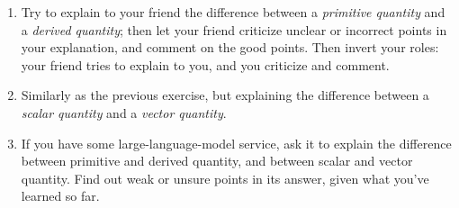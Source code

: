 \documentclass[a4paper,12pt,%
onecolumn,oneside,%
british%
]{memoir}
\newcommand{\elabel}[1]{\label{#1}\marginpar{\vspace{-1.3\baselineskip}\hspace{-8em}\footnotesize Solution p.~\pageref{#1_sol}}}
\renewcommand*{\|}[1][]{\nonscript\:#1\vert\nonscript\:\mathopen{}}
\begin{document}
\begin{enumerate}[exerc]
\item Try to explain to your friend the difference between a \emph{primitive quantity} and a \emph{derived quantity}; then let your friend criticize unclear or incorrect points in your explanation, and comment on the good points. Then invert your roles: your friend tries to explain to you, and you criticize and comment.

\item Similarly as the previous exercise, but explaining the difference between a \emph{scalar quantity} and a \emph{vector quantity}.

\item If you have some large-language-model service, ask it to explain the difference between primitive and derived quantity, and between scalar and vector quantity. Find out weak or unsure points in its answer, given what you've learned so far.
\end{enumerate}

\section{}\elabel{sec:units_functions}
\end{document}
